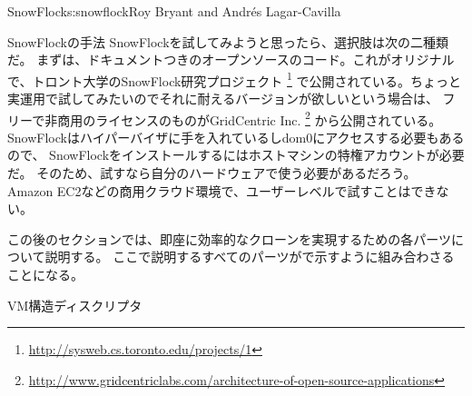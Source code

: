 \begin{aosachapter}{SnowFlock}{s:snowflock}{Roy Bryant and Andr\'e{s} Lagar-Cavilla}
\begin{aosasect1}{SnowFlockの手法}
SnowFlockを試してみようと思ったら、選択肢は次の二種類だ。
まずは、ドキュメントつきのオープンソースのコード。これがオリジナルで、トロント大学のSnowFlock研究プロジェクト
\footnote{\url{http://sysweb.cs.toronto.edu/projects/1}}
で公開されている。ちょっと実運用で試してみたいのでそれに耐えるバージョンが欲しいという場合は、
フリーで非商用のライセンスのものがGridCentric  Inc.
\footnote{\url{http://www.gridcentriclabs.com/architecture-of-open-source-applications}}
から公開されている。
SnowFlockはハイパーバイザに手を入れているしdom0にアクセスする必要もあるので、
SnowFlockをインストールするにはホストマシンの特権アカウントが必要だ。
そのため、試すなら自分のハードウェアで使う必要があるだろう。
Amazon EC2などの商用クラウド環境で、ユーザーレベルで試すことはできない。

この後のセクションでは、即座に効率的なクローンを実現するための各パーツについて説明する。
ここで説明するすべてのパーツがで示すように組み合わさることになる。


\end{aosasect1}

\begin{aosasect1}{VM構造ディスクリプタ}


\end{aosasect1}
\end{aosachapter}
